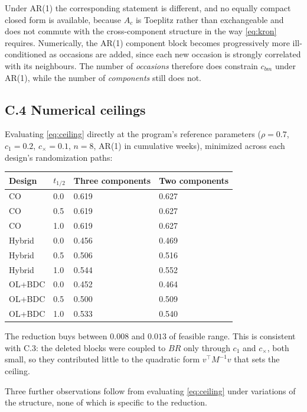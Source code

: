 \documentclass[
  11pt,
]{article}
\newcounter{none} %
\begin{document}
Under AR(1) the corresponding statement is different, and no equally
compact closed form is available, because \(A_c\) is Toeplitz rather
than exchangeable and does not commute with the cross-component
structure in the way \eqref{eq:kron} requires. Numerically, the AR(1)
component block becomes progressively more ill-conditioned as
occasions are added, since each new occasion is strongly correlated
with its neighbours. The number of \emph{occasions} therefore does
constrain \(c_{bm}\) under AR(1), while the number of \emph{components}
still does not.

\subsection{C.4 Numerical ceilings}

Evaluating \eqref{eq:ceiling} directly at the program's reference
parameters (\(\rho = 0.7\), \(c_1 = 0.2\), \(c_{\times} = 0.1\), \(n = 8\),
AR(1) in cumulative weeks), minimized across each design's
randomization paths:

{\def\LTcaptype{none} %
\begin{longtable}[]{@{}llll@{}}
\toprule\noalign{}
Design & \(t_{1/2}\) & Three components & Two components \\
\midrule\noalign{}
\endhead
\bottomrule\noalign{}
\endlastfoot
CO & 0.0 & 0.619 & 0.627 \\
CO & 0.5 & 0.619 & 0.627 \\
CO & 1.0 & 0.619 & 0.627 \\
Hybrid & 0.0 & 0.456 & 0.469 \\
Hybrid & 0.5 & 0.506 & 0.516 \\
Hybrid & 1.0 & 0.544 & 0.552 \\
OL+BDC & 0.0 & 0.452 & 0.464 \\
OL+BDC & 0.5 & 0.500 & 0.509 \\
OL+BDC & 1.0 & 0.533 & 0.540 \\
\end{longtable}
}

The reduction buys between \(0.008\) and \(0.013\) of feasible range.
This is consistent with C.3: the deleted blocks were coupled to \(BR\)
only through \(c_1\) and \(c_{\times}\), both small, so they contributed
little to the quadratic form \(v^{\top} M^{-1} v\) that sets the
ceiling.

Three further observations follow from evaluating \eqref{eq:ceiling}
under variations of the structure, none of which is specific to the
reduction.
\end{document}
